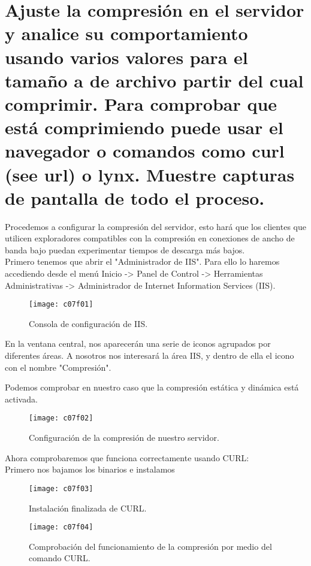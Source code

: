 \section{Ajuste la compresión en el servidor y analice su comportamiento usando varios valores para el tamaño a de archivo partir del cual comprimir. Para comprobar que está comprimiendo puede usar el navegador o comandos como curl (see url) o lynx. Muestre capturas de pantalla de todo el proceso.}

Procedemos a configurar la compresión del servidor, esto hará que los clientes que utilicen exploradores compatibles con la compresión en conexiones de ancho de banda bajo puedan experimentar tiempos de descarga más bajos.\\
Primero tenemos que abrir el "Administrador de IIS". Para ello lo haremos accediendo desde el menú Inicio -> Panel de Control -> Herramientas Administrativas -> Administrador de Internet Information Services (IIS).\\

\begin{figure}[H]
	\centering
	\texttt{[image: c07f01]}
	\caption{Consola de configuración de IIS.}
	\label{fig:c07f01}
\end{figure}

En la ventana central, nos aparecerán una serie de iconos agrupados por diferentes áreas. A nosotros nos interesará la área IIS, y dentro de ella el icono con el nombre "Compresión".

Podemos comprobar en nuestro caso que la compresión estática y dinámica está activada.

\begin{figure}[H]
	\centering
	\texttt{[image: c07f02]}
	\caption{Configuración de la compresión de nuestro servidor.}
	\label{fig:c07f02}
\end{figure}

Ahora comprobaremos que funciona correctamente usando CURL:\\

Primero nos bajamos los binarios e instalamos\\

\begin{figure}[H]
	\centering
	\texttt{[image: c07f03]}
	\caption{Instalación finalizada de CURL.}
	\label{fig:c07f03}
\end{figure}

\begin{figure}[H]
	\centering
	\texttt{[image: c07f04]}
	\caption{Comprobación del funcionamiento de la compresión por medio del comando CURL.}
	\label{fig:c07f04}
\end{figure}


